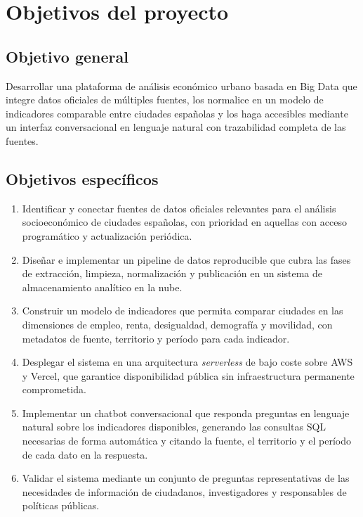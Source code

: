 \section{Objetivos del proyecto}

\subsection{Objetivo general}

Desarrollar una plataforma de análisis económico urbano basada en Big Data que integre datos oficiales de múltiples fuentes, los normalice en un modelo de indicadores comparable entre ciudades españolas y los haga accesibles mediante un interfaz conversacional en lenguaje natural con trazabilidad completa de las fuentes.

\subsection{Objetivos específicos}

\begin{enumerate}
  \item Identificar y conectar fuentes de datos oficiales relevantes para el análisis socioeconómico de ciudades españolas, con prioridad en aquellas con acceso programático y actualización periódica.

  \item Diseñar e implementar un pipeline de datos reproducible que cubra las fases de extracción, limpieza, normalización y publicación en un sistema de almacenamiento analítico en la nube.

  \item Construir un modelo de indicadores que permita comparar ciudades en las dimensiones de empleo, renta, desigualdad, demografía y movilidad, con metadatos de fuente, territorio y período para cada indicador.

  \item Desplegar el sistema en una arquitectura \textit{serverless} de bajo coste sobre AWS y Vercel, que garantice disponibilidad pública sin infraestructura permanente comprometida.

  \item Implementar un chatbot conversacional que responda preguntas en lenguaje natural sobre los indicadores disponibles, generando las consultas SQL necesarias de forma automática y citando la fuente, el territorio y el período de cada dato en la respuesta.

  \item Validar el sistema mediante un conjunto de preguntas representativas de las necesidades de información de ciudadanos, investigadores y responsables de políticas públicas.
\end{enumerate}

